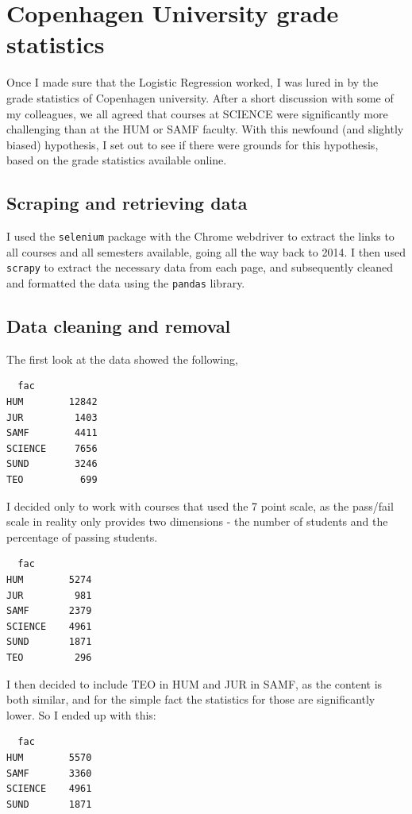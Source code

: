 \documentclass[%
 reprint,
 amsmath,amssymb,
 aps,
]{revtex4-1}
\begin{document}
\section{Copenhagen University grade statistics}
Once I made sure that the Logistic Regression worked, I was lured in by the grade statistics of Copenhagen university.\cite{noauthor_karakterfordeling_nodate}
After a short discussion with some of my colleagues, we all agreed that courses at SCIENCE were significantly more challenging than at the HUM or SAMF faculty.
With this newfound (and slightly biased) hypothesis, I set out to see if there were grounds for this hypothesis, based on the grade statistics available online.

\subsection{Scraping and retrieving data}
I used the \texttt{selenium} package with the Chrome webdriver to extract the links to all courses and all semesters available, going all the way back to 2014. \cite{noauthor_selenium_nodate}
I then used \texttt{scrapy} to extract the necessary data from each page, and subsequently cleaned and formatted the data using the \texttt{pandas} library. \cite{noauthor_scrapy_nodate}\cite{mckinney_data_2010}
\subsection{Data cleaning and removal}
The first look at the data showed the following,
\begin{verbatim}
  fac
HUM        12842
JUR         1403
SAMF        4411
SCIENCE     7656
SUND        3246
TEO          699
\end{verbatim}
I decided only to work with courses that used the 7 point scale, as the pass/fail scale in reality only provides two dimensions - the number of students and the percentage of passing students.
\begin{verbatim}
  fac
HUM        5274
JUR         981
SAMF       2379
SCIENCE    4961
SUND       1871
TEO         296
\end{verbatim}
I then decided to include TEO in HUM and JUR in SAMF, as the content is both similar, and for the simple fact the statistics for those are significantly lower.
So I ended up with this:
\begin{verbatim}
  fac
HUM        5570
SAMF       3360
SCIENCE    4961
SUND       1871
\end{verbatim}
\end{document}
